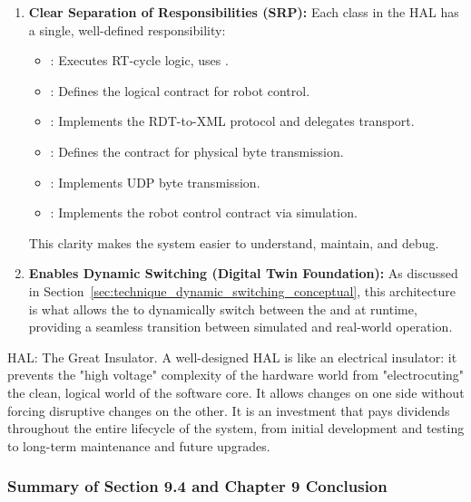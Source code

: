 \begin{enumerate}
    \item \textbf{Clear Separation of Responsibilities (SRP):} Each class in the HAL has a single, well-defined responsibility:
    \begin{itemize}
        \item {}: Executes RT-cycle logic, uses .
        \item {}: Defines the logical contract for robot control.
        \item {}: Implements the RDT-to-XML protocol and delegates transport.
        \item {}: Defines the contract for physical byte transmission.
        \item {}: Implements UDP byte transmission.
        \item {}: Implements the robot control contract via simulation.
    \end{itemize}
    This clarity makes the system easier to understand, maintain, and debug.
    
    \item \textbf{Enables Dynamic Switching (Digital Twin Foundation):} As discussed in Section~\ref{sec:technique_dynamic_switching_conceptual}, this architecture is what allows the  to dynamically switch between the  and  at runtime, providing a seamless transition between simulated and real-world operation.
\end{enumerate}

\begin{principlebox}{HAL: The Great Insulator.}
    A well-designed HAL is like an electrical insulator: it prevents the "high voltage" complexity of the hardware world from "electrocuting" the clean, logical world of the software core. It allows changes on one side without forcing disruptive changes on the other. It is an investment that pays dividends throughout the entire lifecycle of the system, from initial development and testing to long-term maintenance and future upgrades.
\end{principlebox}

\subsubsection{Summary of Section 9.4 and Chapter 9 Conclusion}
\label{subsubsec:hal_chapter_conclusion}


